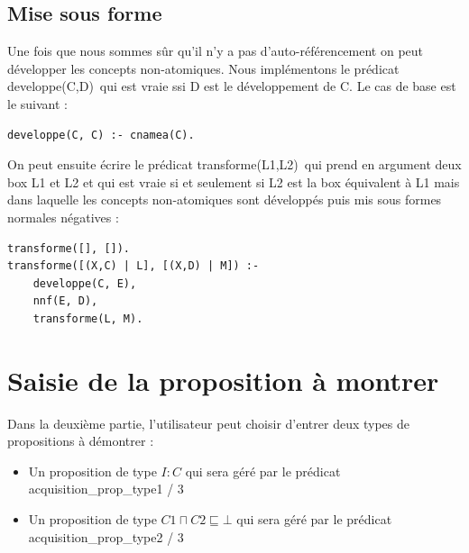 \documentclass{article}
\begin{document}
\subsection{Mise sous forme}
Une fois que nous sommes sûr qu'il n'y a pas d'auto-référencement on peut développer les concepts non-atomiques. Nous implémentons le prédicat \color{blue}developpe(C,D)\color{black}\ qui est vraie ssi D est le développement de C. Le cas de base est le suivant : 
\begin{verbatim}
developpe(C, C) :- cnamea(C).
\end{verbatim}
On peut ensuite écrire le prédicat \color{blue}transforme(L1,L2)\color{black}\ qui prend en argument deux box L1 et L2 et qui est vraie si et seulement si L2 est la box équivalent à L1 mais dans laquelle les concepts non-atomiques sont développés puis mis sous formes normales négatives :
\begin{verbatim}
transforme([], []).
transforme([(X,C) | L], [(X,D) | M]) :- 
	developpe(C, E),
	nnf(E, D),
	transforme(L, M).
\end{verbatim}

\section{Saisie de la proposition à montrer}
Dans la deuxième partie, l'utilisateur peut choisir d'entrer deux types de propositions à démontrer : 
\begin{itemize}
    \item Un proposition de type $ I : C $ qui sera géré par le prédicat \color{blue}acquisition\_prop\_type1 / 3 \color{black}
    \item Un proposition de type $ C1 \sqcap C2 \sqsubseteq \bot  $ qui sera géré par le prédicat \color{blue}acquisition\_prop\_type2 / 3 \color{black}
\end{itemize}
\end{document}
